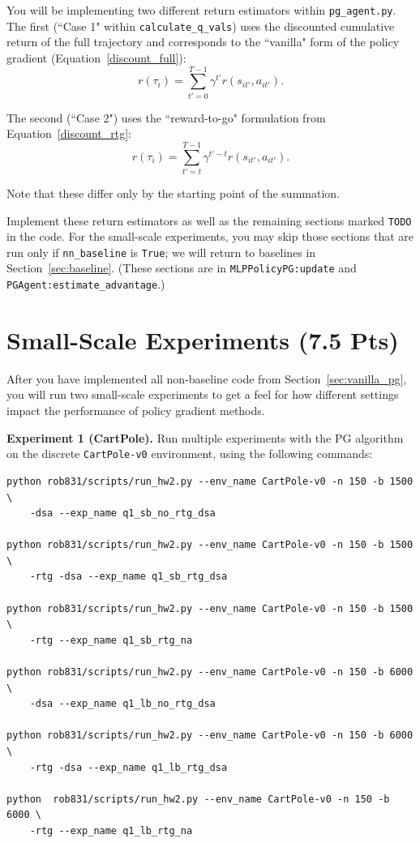 \documentclass{article}
\begin{document}
You will be implementing two different return estimators within \texttt{pg\_agent.py}. The first (``Case 1" within \texttt{calculate\_q\_vals}) uses the discounted cumulative return of the full trajectory and corresponds to the ``vanilla" form of the policy gradient (Equation~\ref{discount_full}):
\begin{equation}
r(\tau_i) = \sum_{t'=0}^{T-1} \gamma^{t'} r(s_{it'}, a_{it'}).
\end{equation}

The second (``Case 2") uses the ``reward-to-go" formulation from Equation~\ref{discount_rtg}:
\begin{equation}
 r(\tau_i) = \sum_{t'=t}^{T-1} \gamma^{t'-t} r(s_{it'}, a_{it'}).
\end{equation}

Note that these differ only by the starting point of the summation.

Implement these return estimators as well as the remaining sections marked \texttt{TODO} in the code. For the small-scale experiments, you may skip those sections that are run only if \texttt{nn\_baseline} is \texttt{True}; we will return to baselines in Section~\ref{sec:baseline}. (These sections are in \texttt{MLPPolicyPG:update} and \texttt{PGAgent:estimate\_advantage}.)

\section{Small-Scale Experiments (7.5 Pts)}
After you have implemented all non-baseline code from Section~\ref{sec:vanilla_pg}, you will run two small-scale experiments to get a feel for how different settings impact the performance of policy gradient methods.

\vspace{0.1in}
\textbf{Experiment 1 (CartPole).} Run multiple experiments with the PG algorithm on the discrete \verb|CartPole-v0| environment, using the following commands:
\begin{lstlisting}[escapechar=@]
python rob831/scripts/run_hw2.py --env_name CartPole-v0 -n 150 -b 1500 \ 
    -dsa --exp_name q1_sb_no_rtg_dsa

python rob831/scripts/run_hw2.py --env_name CartPole-v0 -n 150 -b 1500 \ 
    -rtg -dsa --exp_name q1_sb_rtg_dsa

python rob831/scripts/run_hw2.py --env_name CartPole-v0 -n 150 -b 1500 \ 
    -rtg --exp_name q1_sb_rtg_na

python rob831/scripts/run_hw2.py --env_name CartPole-v0 -n 150 -b 6000 \ 
    -dsa --exp_name q1_lb_no_rtg_dsa

python rob831/scripts/run_hw2.py --env_name CartPole-v0 -n 150 -b 6000 \ 
    -rtg -dsa --exp_name q1_lb_rtg_dsa

python  rob831/scripts/run_hw2.py --env_name CartPole-v0 -n 150 -b 6000 \ 
    -rtg --exp_name q1_lb_rtg_na
\end{lstlisting}
\end{document}
